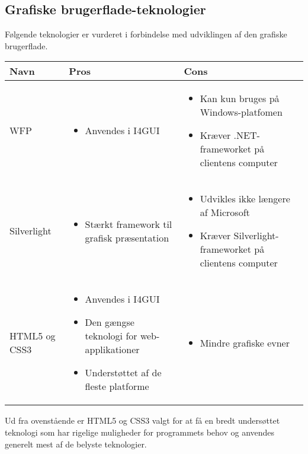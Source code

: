 \subsection*{Grafiske brugerflade-teknologier}

Følgende teknologier er vurderet i forbindelse med udviklingen af den grafiske brugerflade.

\begin{tabular}{|p{3cm}|p{5.5cm}|p{5.5cm}|}
\hline 
\textbf{Navn} & \textbf{Pros} & \textbf{Cons} \\ 
\hline

WFP
	&
	\begin{itemize}
		\item Anvendes i I4GUI
	\end{itemize}
	&
	\begin{itemize}
		\item Kan kun bruges på Windows-platfomen
		\item Kræver .NET-frameworket på clientens computer
	\end{itemize}
	\\
	\hline

Silverlight
	&
	\begin{itemize}
		\item Stærkt framework til grafisk præsentation
	\end{itemize}
	&
	\begin{itemize}
		\item Udvikles ikke længere af Microsoft
		\item Kræver Silverlight-\newline frameworket på clientens computer
	\end{itemize}
	\\
	\hline

HTML5 og CSS3
	&
	\begin{itemize}
		\item Anvendes i I4GUI
		\item Den gængse teknologi for web-applikationer
		\item Understøttet af de fleste platforme
	\end{itemize}
	&
	\begin{itemize}
	\item Mindre grafiske evner
	\end{itemize}
	\\
	\hline
\end{tabular} 

Ud fra ovenstående er HTML5 og CSS3 valgt for at få en bredt undersøttet teknologi som har rigelige muligheder for programmets behov og anvendes generelt mest af de belyste teknologier.